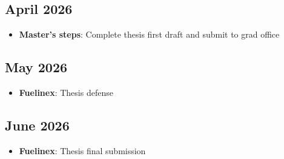 \documentclass{article}
\begin{document}
\subsection*{April 2026}
\begin{itemize}
    \item \textbf{Master's steps}: Complete thesis first draft and submit to grad office
\end{itemize}

\subsection*{May 2026}
\begin{itemize}
    \item \textbf{Fuelinex}: Thesis defense
\end{itemize}

\subsection*{June 2026}
\begin{itemize}
    \item \textbf{Fuelinex}: Thesis final submission
\end{itemize}


\end{document}
